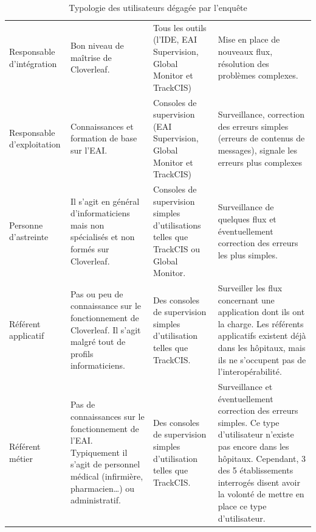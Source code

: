 			\begin{table}[H]
				\centering
				\caption{\label{type_utilisateurs} Typologie des utilisateurs dégagée par
				l'enquête}
				\begin{tabular}{| p{3cm} | p{4cm} | p{4,5cm} | p{} |}
					\hline
						\thead{Utilisateur}
						&\thead{Niveau de maîtrise}
						&\thead{Outils utilisés}
						&\thead{Rôles}
						\\
					\hline
						Responsable d'intégration
						&
						Bon niveau de maîtrise de Cloverleaf.
						&
						Tous les outils (l'IDE, EAI Supervision, Global Monitor et TrackCIS)
						&
						Mise en place de nouveaux flux, résolution des problèmes complexes.
						\\
					\hline
						Responsable d'exploitation
						&
						Connaissances et formation de base sur l’EAI.
						&
						Consoles de supervision (EAI Supervision, Global Monitor et TrackCIS)
						&
						Surveillance, correction des erreurs simples (erreurs de contenus de
						messages), signale les erreurs plus complexes
						\\
					\hline
						Personne d'astreinte
						&
						Il s'agit en général d'informaticiens mais non spécialisés et non formés
						sur Cloverleaf.
						&
						Consoles de supervision simples d'utilisations telles que TrackCIS ou
						Global Monitor.
						&
						Surveillance de quelques flux et éventuellement correction des erreurs les
						plus simples.
						\\
					\hline
						Référent applicatif
						&
						Pas ou peu de connaissance sur le fonctionnement de Cloverleaf. Il s'agit
						malgré tout de profils informaticiens.
						&
						Des consoles de supervision simples d'utilisation telles que TrackCIS.
						&
						Surveiller les flux concernant une application dont ils ont la charge. Les
						référents applicatifs existent déjà dans les hôpitaux, mais ils ne
						s'occupent pas de l'interopérabilité.
						\\
					\hline
						Référent métier
						&
						Pas de connaissances sur le fonctionnement de l’EAI. Typiquement il s'agit
						de personnel médical (infirmière, pharmacien\ldots) ou administratif.
						&
						Des consoles de supervision simples d'utilisation telles que TrackCIS.
						&
						Surveillance et éventuellement correction des erreurs simples. Ce type
						d'utilisateur n'existe pas encore dans les hôpitaux. Cependant, 3 des 5
						établissements interrogés disent avoir la volonté de mettre en place ce
						type d'utilisateur.
						\\
					\hline
				\end{tabular}
			\end{table}
